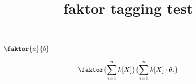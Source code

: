 \documentclass{article}
\title{faktor tagging test}
\begin{document}
$\faktor{a}{b}$

\[\faktor{\sum_{i=1}^n k[X]}{\sum_{i=1}^n k[X] \cdot \theta_i}\]
\end{document}
